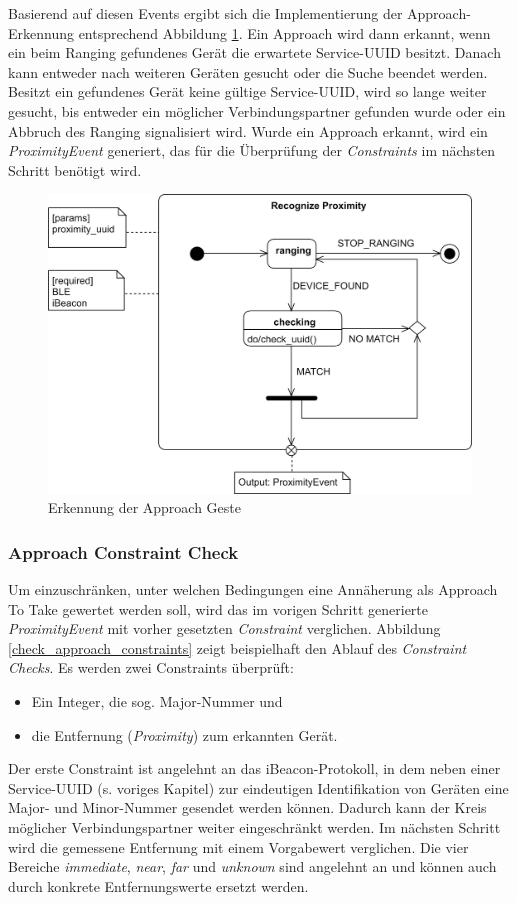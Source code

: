 {Basierend auf diesen Events ergibt sich die Implementierung der Approach-Erkennung entsprechend Abbildung \ref{recognize_approach}. Ein Approach wird dann erkannt, wenn ein beim Ranging gefundenes Gerät die erwartete Service-UUID besitzt. Danach kann entweder nach weiteren Geräten gesucht oder die Suche beendet werden. Besitzt ein gefundenes Gerät keine gültige Service-UUID, wird so lange weiter gesucht, bis entweder ein möglicher Verbindungspartner gefunden wurde oder ein Abbruch des Ranging signalisiert wird. Wurde ein Approach erkannt, wird ein \textit{ProximityEvent} generiert, das für die Überprüfung der \textit{Constraints} im nächsten Schritt benötigt wird.

\begin{figure}[h]
\includegraphics[width=\textwidth]{approach_recognize.png}
\caption{Erkennung der Approach Geste}
\label{recognize_approach}
\end{figure}

\subsubsection*{Approach Constraint Check}
Um einzuschränken, unter welchen Bedingungen eine Annäherung als Approach To Take gewertet werden soll, wird das im vorigen Schritt generierte \textit{ProximityEvent} mit vorher gesetzten \textit{Constraint} verglichen. Abbildung \ref{check_approach_constraints} zeigt beispielhaft den Ablauf des \textit{Constraint Checks}. Es werden zwei Constraints überprüft:
\begin{itemize}
\item Ein Integer, die sog. Major-Nummer und
\item die Entfernung (\textit{Proximity}) zum erkannten Gerät.
\end{itemize}
Der erste Constraint ist angelehnt an das iBeacon-Protokoll, in dem neben einer Service-UUID (s. voriges Kapitel) zur eindeutigen Identifikation von Geräten eine Major- und Minor-Nummer gesendet werden können. Dadurch kann der Kreis möglicher Verbindungspartner weiter eingeschränkt werden. 
Im nächsten Schritt wird die gemessene Entfernung mit einem Vorgabewert verglichen. Die vier Bereiche \textit{immediate}, \textit{near}, \textit{far} und \textit{unknown} sind angelehnt an \cite{Marquardt2015} und können auch durch konkrete Entfernungswerte ersetzt werden.\\

}
